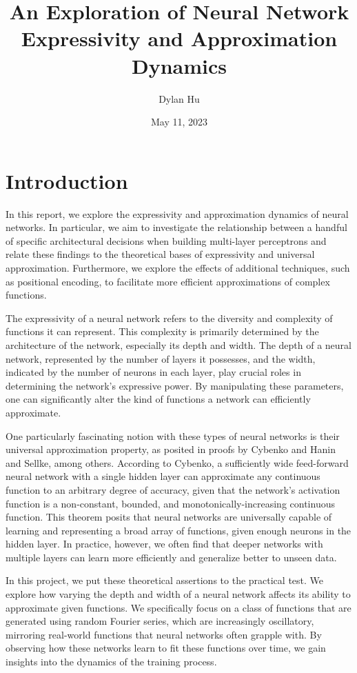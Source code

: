 \documentclass[11pt]{article}
\title{An Exploration of Neural Network Expressivity and Approximation Dynamics}
\author{Dylan Hu}
\date{May 11, 2023}
\begin{document}
\maketitle
{
  \hypersetup{linkcolor=black}
  \tableofcontents
}
\section{Introduction}
In this report, we explore the expressivity and approximation dynamics of neural networks. In particular, we aim to investigate the relationship between a handful of specific architectural decisions when building multi-layer perceptrons and relate these findings to the theoretical bases of expressivity and universal approximation. Furthermore, we explore the effects of additional techniques, such as positional encoding, to facilitate more efficient approximations of complex functions.

The expressivity of a neural network refers to the diversity and complexity of functions it can represent. This complexity is primarily determined by the architecture of the network, especially its depth and width. The depth of a neural network, represented by the number of layers it possesses, and the width, indicated by the number of neurons in each layer, play crucial roles in determining the network's expressive power. By manipulating these parameters, one can significantly alter the kind of functions a network can efficiently approximate.

One particularly fascinating notion with these types of neural networks is their universal approximation property, as posited in proofs by Cybenko and Hanin and Sellke, among others. According to Cybenko, a sufficiently wide feed-forward neural network with a single hidden layer can approximate any continuous function to an arbitrary degree of accuracy, given that the network's activation function is a non-constant, bounded, and monotonically-increasing continuous function. This theorem posits that neural networks are universally capable of learning and representing a broad array of functions, given enough neurons in the hidden layer. In practice, however, we often find that deeper networks with multiple layers can learn more efficiently and generalize better to unseen data.

In this project, we put these theoretical assertions to the practical test. We explore how varying the depth and width of a neural network affects its ability to approximate given functions. We specifically focus on a class of functions that are generated using random Fourier series, which are increasingly oscillatory, mirroring real-world functions that neural networks often grapple with. By observing how these networks learn to fit these functions over time, we gain insights into the dynamics of the training process.
\end{document}
